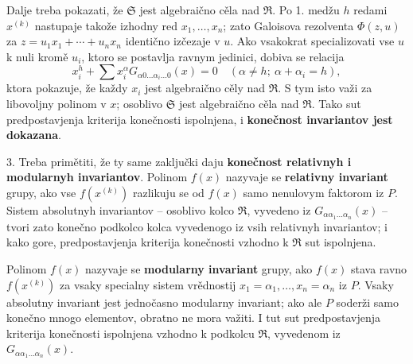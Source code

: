 \documentclass[11pt]{article}
\begin{document}
Dalje treba pokazati, že $\mathfrak S$ jest algebraično cěla nad $\mathfrak R$. Po 1. medžu $h$ redami $x^{(k)}$ nastupaje takože izhodny red $x_1,\ldots,x_n$; zato Galoisova rezolventa $\Phi(z,u)$ za $z=u_1x_1+\cdots+u_nx_n$ identično izčezaje v $u$. Ako vsakokrat specializovati vse $u$ k nuli kromě $u_i$, ktoro se postavlja ravnym jedinici, dobiva se relacija
\[
 x_i^h+\sum x_i^\alpha G_{\alpha0\ldots\alpha_i\ldots0}(x)=0
 \quad (\alpha\ne h;\ \alpha+\alpha_i=h),
\]
ktora pokazuje, že každy $x_i$ jest algebraično cěly nad $\mathfrak R$. S tym isto važi za libovoljny polinom v $x$; osoblivo $\mathfrak S$ jest algebraično cěla nad $\mathfrak R$. Tako sut predpostavjenja kriterija konečnosti ispolnjena, i \textbf{konečnost invariantov jest dokazana}.

3. Treba primětiti, že ty same zaključki daju \textbf{konečnost relativnyh i modularnyh invariantov}. Polinom $f(x)$ nazyvaje se \textbf{relativny invariant} grupy, ako vse $f(x^{(k)})$ razlikuju se od $f(x)$ samo nenulovym faktorom iz $P$. Sistem absolutnyh invariantov -- osoblivo kolco $\mathfrak R$, vyvedeno iz $G_{\alpha\alpha_1\ldots\alpha_n}(x)$ -- tvori zato konečno podkolco kolca vyvedenogo iz vsih relativnyh invariantov; i kako gore, predpostavjenja kriterija konečnosti vzhodno k $\mathfrak R$ sut ispolnjena.

Polinom $f(x)$ nazyvaje se \textbf{modularny invariant} grupy, ako $f(x)$ stava ravno $f(x^{(k)})$ za vsaky specialny sistem vrědnostij $x_1=\alpha_1,\ldots,x_n=\alpha_n$ iz $P$. Vsaky absolutny invariant jest jednočasno modularny invariant; ako ale $P$ soderži samo konečno mnogo elementov, obratno ne mora važiti. I tut sut predpostavjenja kriterija konečnosti ispolnjena vzhodno k podkolcu $\mathfrak R$, vyvedenom iz $G_{\alpha\alpha_1\ldots\alpha_n}(x)$.

\clearpage
\end{document}
